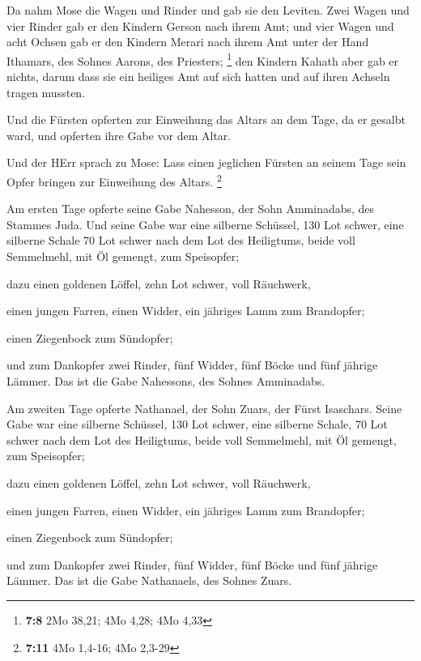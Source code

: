  Da nahm Mose die Wagen und Rinder und gab sie den
Leviten.  Zwei Wagen und vier Rinder gab er den Kindern
Gerson nach ihrem Amt;  und vier Wagen und acht Ochsen gab
er den Kindern Merari nach ihrem Amt unter der Hand Ithamars, des Sohnes
Aarons, des Priesters; \footnote{\textbf{7:8} 2Mo 38,21; 4Mo 4,28; 4Mo
  4,33}  den Kindern Kahath aber gab er nichts, darum dass
sie ein heiliges Amt auf sich hatten und auf ihren Achseln tragen
mussten.

 Und die Fürsten opferten zur Einweihung das Altars an
dem Tage, da er gesalbt ward, und opferten ihre Gabe vor dem Altar.

 Und der HErr sprach zu Mose: Lass einen jeglichen
Fürsten an seinem Tage sein Opfer bringen zur Einweihung des Altars.
\footnote{\textbf{7:11} 4Mo 1,4-16; 4Mo 2,3-29}

 Am ersten Tage opferte seine Gabe Nahesson, der Sohn
Amminadabs, des Stammes Juda.  Und seine Gabe war eine
silberne Schüssel, 130 Lot schwer, eine silberne Schale 70 Lot schwer
nach dem Lot des Heiligtums, beide voll Semmelmehl, mit Öl gemengt, zum
Speisopfer;

 dazu einen goldenen Löffel, zehn Lot schwer, voll
Räuchwerk,

 einen jungen Farren, einen Widder, ein jähriges Lamm zum
Brandopfer;

 einen Ziegenbock zum Sündopfer;

 und zum Dankopfer zwei Rinder, fünf Widder, fünf Böcke
und fünf jährige Lämmer. Das ist die Gabe Nahessons, des Sohnes
Amminadabs.

 Am zweiten Tage opferte Nathanael, der Sohn Zuars, der
Fürst Isaschars.  Seine Gabe war eine silberne Schüssel,
130 Lot schwer, eine silberne Schale, 70 Lot schwer nach dem Lot des
Heiligtums, beide voll Semmelmehl, mit Öl gemengt, zum Speisopfer;

 dazu einen goldenen Löffel, zehn Lot schwer, voll
Räuchwerk,

 einen jungen Farren, einen Widder, ein jähriges Lamm zum
Brandopfer;

 einen Ziegenbock zum Sündopfer;

 und zum Dankopfer zwei Rinder, fünf Widder, fünf Böcke
und fünf jährige Lämmer. Das ist die Gabe Nathanaels, des Sohnes Zuars.

